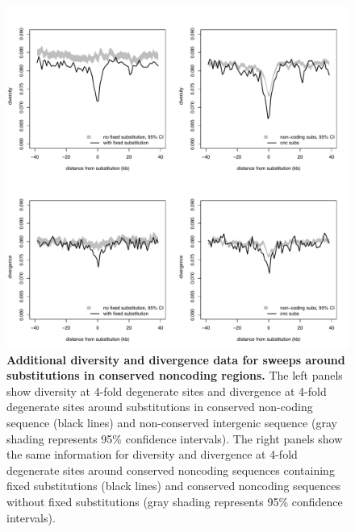 \begin{figure}[ht!]
      \centering
       \includegraphics[width=\linewidth]{Ch2FigS9}
    \caption{\textbf{Additional diversity and divergence data for sweeps around substitutions in conserved noncoding regions.} The left panels show diversity at 4-fold degenerate sites and divergence at 4-fold degenerate sites around substitutions in conserved non-coding sequence (black lines) and non-conserved intergenic sequence (gray shading represents 95\% confidence intervals). The right panels show the same information for diversity and divergence at 4-fold degenerate sites around conserved noncoding sequences containing fixed substitutions (black lines) and conserved noncoding sequences without fixed substitutions (gray shading represents 95\% confidence intervals).}
    \label{fig:figS9}
\end{figure}

